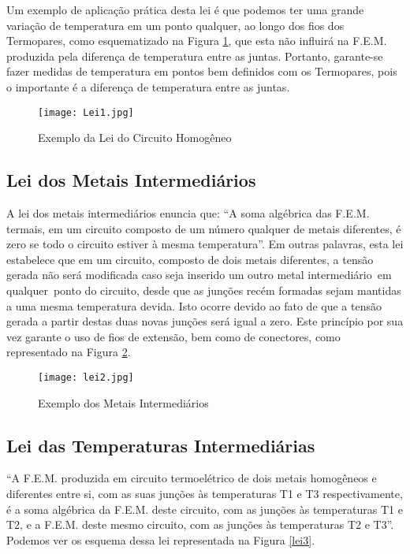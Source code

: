 \documentclass[a4paper,12pt]{report}
\begin{document}
	\singlespacing
	
	Um exemplo de aplicação prática desta lei é que podemos ter uma grande variação de temperatura em um ponto qualquer, ao longo dos fios dos Termopares, como esquematizado na Figura \ref{lei1}, que esta não influirá na F.E.M. produzida pela diferença de temperatura entre as juntas. Portanto, garante-se fazer medidas de temperatura em pontos bem definidos com os Termopares, pois o importante é a diferença de temperatura entre as juntas.
	
	\singlespacing
	
	\begin{figure}[htbp]
		\centering
		\texttt{[image: Lei1.jpg]}
		\caption{Exemplo da Lei do Circuito Homogêneo}
		\label{lei1}
	\end{figure}
	
	\subsection{Lei dos Metais Intermediários}
	
	A lei dos metais intermediários enuncia que: ``A soma algébrica das F.E.M. termais, em um circuito composto de um número qualquer de metais diferentes, é zero se todo o circuito estiver à mesma temperatura”. Em outras palavras, esta lei estabelece que em um circuito, composto de dois metais diferentes, a tensão gerada não será modificada caso seja inserido um outro metal intermediário em qualquer ponto do circuito, desde que as junções recém formadas sejam mantidas a uma mesma temperatura devida. Isto ocorre devido ao fato de que a tensão gerada a partir destas duas novas junções será igual a zero. Este princípio por sua vez garante o uso de fios de extensão, bem como de conectores, como  representado na Figura \ref{lei2}.
	
	\singlespacing
	
	\begin{figure}[htbp]
		\centering
		\texttt{[image: lei2.jpg]}
		\caption{Exemplo dos Metais Intermediários}
		\label{lei2}
	\end{figure}
	
	\newpage
	\subsection{Lei das Temperaturas Intermediárias}
	
	“A F.E.M. produzida em circuito termoelétrico de dois metais homogêneos e diferentes entre si, com as suas junções às temperaturas T1 e T3 respectivamente, é a soma algébrica da F.E.M. deste circuito, com as junções às temperaturas T1 e T2, e a F.E.M. deste mesmo circuito, com as junções às temperaturas T2 e T3”. Podemos ver os esquema dessa lei representada na Figura \ref{lei3}.
	
\end{document}

